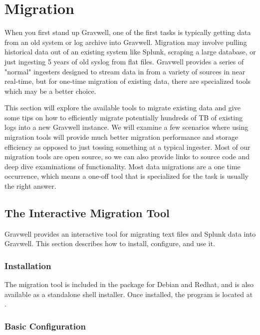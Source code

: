 \chapter{Migration}
\label{chapter:migration}

When you first stand up Gravwell, one of the first tasks is typically getting data from an old system or log archive into Gravwell.  Migration may involve pulling historical data out of an existing system like Splunk, scraping a large database, or just ingesting 5 years of old syslog from flat files.  Gravwell provides a series of "normal" ingesters designed to stream data in from a variety of sources in near real-time, but for one-time migration of existing data, there are specialized tools which may be a better choice.

This section will explore the available tools to migrate existing data and give some tips on how to efficiently migrate potentially hundreds of TB of existing logs into a new Gravwell instance.  We will examine a few scenarios where using migration tools will provide much better migration performance and storage efficiency as opposed to just tossing something at a typical ingester.  Most of our migration tools are open source, so we can also provide links to source code and deep dive examinations of functionality.  Most data migrations are a one time occurrence, which means a one-off tool that is specialized for the task is usually the right answer.  

\section{The Interactive Migration Tool}
Gravwell provides an interactive tool for migrating text files and Splunk data into Gravwell. This section describes how to install, configure, and use it.

\subsection{Installation}

The migration tool is included in the  package for Debian and Redhat, and is also available as a standalone shell installer. Once installed, the program is located at .

\subsection{Basic Configuration}
\label{sec:migrate-config}

